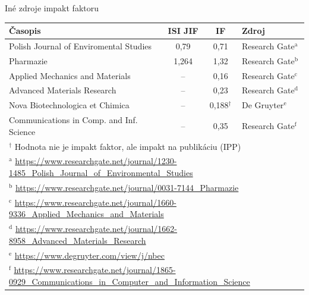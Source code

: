 \documentclass{beamer}
\begin{document}
\begin{frame}{Iné zdroje impakt faktoru}
  \begin{table}
    \centering\footnotesize
    \begin{tabular}{lccl}
      \toprule
      Časopis & ISI JIF & IF & Zdroj \\
      \midrule
      Polish Journal of Enviromental Studies   & 0,79  & 0,71           & Research Gate$^{\mathrm{a}}$ \\[0.5ex]
      Pharmazie                                & 1,264 & 1,32           & Research Gate$^{\mathrm{b}}$ \\[0.5ex]
      Applied Mechanics and Materials          & --    & 0,16           & Research Gate$^{\mathrm{c}}$ \\[0.5ex]
      Advanced Materials Research              & --    & 0,23           & Research Gate$^{\mathrm{d}}$ \\[0.5ex]
      Nova Biotechnologica et Chimica          & --    & 0,188$^\dagger$ & De Gruyter$^{\mathrm{e}}$    \\[0.5ex]
      Communications in Comp. and Inf. Science & --    & 0,35           & Research Gate$^{\mathrm{f}}$ \\[0.5ex]
      \bottomrule
      \multicolumn{4}{l}{\tiny $^\dagger$ Hodnota nie je impakt faktor, ale impakt na publikáciu (IPP)} \\
      \multicolumn{4}{l}{\tiny $^{\mathrm{a}}$ \url{https://www.researchgate.net/journal/1230-1485\_Polish\_Journal\_of\_Environmental\_Studies}} \\
      \multicolumn{4}{l}{\tiny $^{\mathrm{b}}$ \url{https://www.researchgate.net/journal/0031-7144\_Pharmazie}} \\
      \multicolumn{4}{l}{\tiny $^{\mathrm{c}}$ \url{https://www.researchgate.net/journal/1660-9336\_Applied\_Mechanics\_and\_Materials}} \\
      \multicolumn{4}{l}{\tiny $^{\mathrm{d}}$ \url{https://www.researchgate.net/journal/1662-8958\_Advanced\_Materials\_Research}} \\
      \multicolumn{4}{l}{\tiny $^{\mathrm{e}}$ \url{https://www.degruyter.com/view/j/nbec}} \\
      \multicolumn{4}{l}{\tiny $^{\mathrm{f}}$ \url{https://www.researchgate.net/journal/1865-0929\_Communications\_in\_Computer\_and\_Information\_Science}} \\
    \end{tabular}
  \end{table}
\end{frame}
\end{document}
